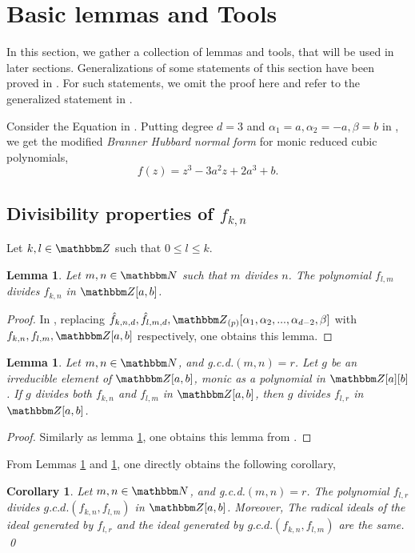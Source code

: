 \documentclass[reqno]{amsart}
\numberwithin{equation}{section}
\theoremstyle{plain}
\newtheorem{lemma}[theorem]{Lemma}
\newtheorem{corollary}[theorem]{Corollary}
\theoremstyle{definition}
\theoremstyle{definition}
\newcommand{\Z}{{\mathbbm Z}}
\newcommand{\N}{{\mathbbm N}}
\begin{document}
\section{Basic lemmas and Tools}\label{lemmas}
In this section, we gather a collection of lemmas and tools, that will be used in later sections. Generalizations of some statements of this section have been proved in \cite{Pat23}. For such statements, we omit the proof here and refer to the generalized statement in \cite{Pat23}.

Consider the Equation in \cite[Equation~$(2.2)$]{Pat23}. Putting degree $d=3$ and $\alpha_{1}= a, \alpha_{2}= -a, \beta= b$ in \cite[Equation~$(2.2)$]{Pat23}, we get the modified \emph{Branner Hubbard normal form} for monic reduced cubic polynomials,
    \begin{equation}
        f(z) = z^{3} -3a^{2}z + 2a^{3} +b.
    \end{equation}    
\subsection{Divisibility properties of $f_{k,n}$} 
    Let $k,l\in \Z$ such that $0\leq l\leq k$. 
    \begin{lemma}\label{l}
        Let $m,n \in \N$ such that $m$ divides $n$. The polynomial $f_{l,m}$ divides $f_{k,n}$ in $\Z[a,b]$.
    \end{lemma}
    \begin{proof}
        In \cite[Lemma~4.1]{Pat23}, replacing $\hat{f}_{k,n,d}, \hat{f}_{l,m,d}, \Z_{(p)}[\alpha_{1},\alpha_{2},...,\alpha_{d-2}, \beta]$ with $f_{k,n}, f_{l,m}, \Z[a,b]$ respectively, one obtains this lemma.
    \end{proof}
    \begin{lemma}\label{k}
        Let $m,n\in \N$, and g.c.d.$(m,n)=r$. Let $g$ be an irreducible element of $\Z[a,b]$, monic as a polynomial in  $\Z[a][b]$. If $g$ divides both $f_{k,n}$ and $f_{l,m}$ in $\Z[a,b]$, then $g$ divides $f_{l,r}$ in $\Z[a,b]$.
    \end{lemma}
    \begin{proof}
        Similarly as lemma \ref{l}, one obtains this lemma from \cite[Lemma~$4.2$]{Pat23}.
    \end{proof}
    From Lemmas \ref{l} and \ref{k}, one directly obtains the following corollary,
    \begin{corollary}
        Let $m,n\in \N$, and g.c.d.$(m,n)=r$. The polynomial $f_{l,r}$ divides $g.c.d.(f_{k,n},f_{l,m})$ in $\Z[a,b]$. Moreover, The radical ideals of the ideal generated by $f_{l,r}$ and the ideal generated by $g.c.d.(f_{k,n},f_{l,m})$ are the same. \qed
    \end{corollary}
\end{document}
